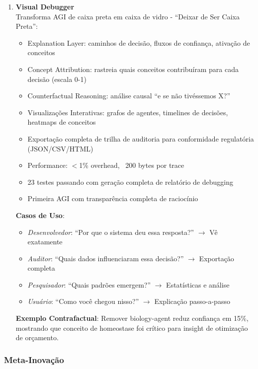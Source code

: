 \documentclass[11pt]{article}
\begin{document}
\begin{enumerate}
    \item \textbf{Visual Debugger} \\
    Transforma AGI de caixa preta em caixa de vidro - ``Deixar de Ser Caixa Preta'':
    \begin{itemize}
        \item Explanation Layer: caminhos de decisão, fluxos de confiança, ativação de conceitos
        \item Concept Attribution: rastreia quais conceitos contribuíram para cada decisão (escala 0-1)
        \item Counterfactual Reasoning: análise causal ``e se não tivéssemos X?''
        \item Visualizações Interativas: grafos de agentes, timelines de decisões, heatmaps de conceitos
        \item Exportação completa de trilha de auditoria para conformidade regulatória (JSON/CSV/HTML)
        \item Performance: $<$1\% overhead, ~200 bytes por trace
        \item 23 testes passando com geração completa de relatório de debugging
        \item Primeira AGI com transparência completa de raciocínio
    \end{itemize}

\textbf{Casos de Uso}:
\begin{itemize}
    \item \textit{Desenvolvedor}: ``Por que o sistema deu essa resposta?'' $\rightarrow$ Vê exatamente
    \item \textit{Auditor}: ``Quais dados influenciaram essa decisão?'' $\rightarrow$ Exportação completa
    \item \textit{Pesquisador}: ``Quais padrões emergem?'' $\rightarrow$ Estatísticas e análise
    \item \textit{Usuário}: ``Como você chegou nisso?'' $\rightarrow$ Explicação passo-a-passo
\end{itemize}

\textbf{Exemplo Contrafactual}: Remover biology-agent reduz confiança em 15\%, mostrando que conceito de homeostase foi crítico para insight de otimização de orçamento.
\end{enumerate}

\subsubsection{Meta-Inovação}
\end{document}
